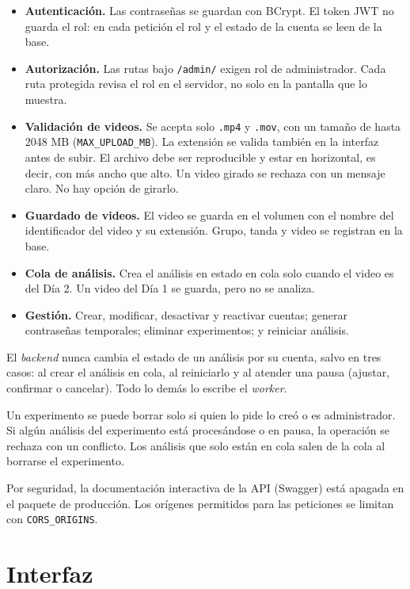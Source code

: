 \begin{itemize}
  \item \textbf{Autenticación.} Las contraseñas se guardan con BCrypt. El token JWT no guarda el rol:
  en cada petición el rol y el estado de la cuenta se leen de la base.
  \item \textbf{Autorización.} Las rutas bajo \texttt{/admin/} exigen rol de administrador. Cada ruta
  protegida revisa el rol en el servidor, no solo en la pantalla que lo muestra.
  \item \textbf{Validación de videos.} Se acepta solo \texttt{.mp4} y \texttt{.mov}, con un tamaño de hasta
  2048 MB (\texttt{MAX\_UPLOAD\_MB}). La extensión se valida también en la interfaz antes de subir. El
  archivo debe ser reproducible y estar en horizontal, es decir, con más ancho que alto. Un video girado
  se rechaza con un mensaje claro. No hay opción de girarlo.
  \item \textbf{Guardado de videos.} El video se guarda en el volumen con el nombre del identificador del
  video y su extensión. Grupo, tanda y video se registran en la base.
  \item \textbf{Cola de análisis.} Crea el análisis en estado en cola solo cuando el video es del Día 2.
  Un video del Día 1 se guarda, pero no se analiza.
  \item \textbf{Gestión.} Crear, modificar, desactivar y reactivar cuentas; generar contraseñas temporales;
  eliminar experimentos; y reiniciar análisis.
\end{itemize}

El \textit{backend} nunca cambia el estado de un análisis por su cuenta, salvo en tres casos: al crear el
análisis en cola, al reiniciarlo y al atender una pausa (ajustar, confirmar o cancelar). Todo lo demás lo escribe el
\textit{worker}.

Un experimento se puede borrar solo si quien lo pide lo creó o es administrador. Si algún análisis del
experimento está procesándose o en pausa, la operación se rechaza con un conflicto. Los análisis que
solo están en cola salen de la cola al borrarse el experimento.

Por seguridad, la documentación interactiva de la API (Swagger) está apagada en el paquete de producción.
Los orígenes permitidos para las peticiones se limitan con \texttt{CORS\_ORIGINS}.

\section{Interfaz}


